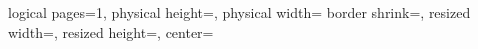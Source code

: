 \providecommand{\autopstpdfConflictResolutionTemporary}{}

\renewcommand{\autopstpdfConflictResolutionTemporary}{
\usepackage[
dvips={-o -Ppdf}, 
pspdf={
-dNOSAFER
-dAutoRotatePages=/None %
}, 
pdfcrop={}, 
crop=off%
]{auto-pst-pdf}
}

\usepackage{pgfpages}
{
  \edef\pgfpageoptionheight{\the\paperheight} 
  \edef\pgfpageoptionwidth{\the\paperwidth}
  \edef\pgfpageoptionborder{0pt}
}
{
  \pgfpagesphysicalpageoptions
  {%
    logical pages=1,%
    physical height=\pgfpageoptionheight,%
    physical width=\pgfpageoptionwidth%
  }
  {%
    border shrink=\pgfpageoptionborder,%
    resized width=\pgfphysicalwidth,%
    resized height=\pgfphysicalheight,%
    center=\pgfpoint{.5\pgfphysicalwidth}{.5\pgfphysicalheight}%
  }%
}
